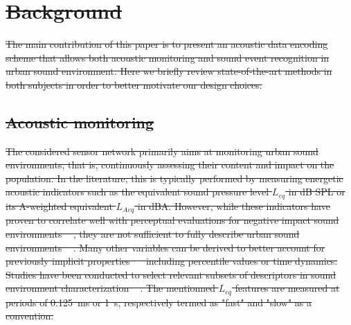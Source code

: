 \documentclass[sensors,article,submit,moreauthors,pdftex,10pt,a4paper]{mdpi}
\providecommand{\DIFaddtex}[1]{{\protect\color{blue}\uwave{#1}}} %
\providecommand{\DIFdeltex}[1]{{\protect\color{red}\sout{#1}}}                      %
\providecommand{\DIFaddbegin}{} %
\providecommand{\DIFaddend}{} %
\providecommand{\DIFdelbegin}{} %
\providecommand{\DIFdelend}{} %
\providecommand{\DIFadd}[1]{\texorpdfstring{\DIFaddtex{#1}}{#1}} %
\providecommand{\DIFdel}[1]{\texorpdfstring{\DIFdeltex{#1}}{}} %
\begin{document}
\section{\DIFdelbegin \DIFdel{Background}\DIFdelend \DIFaddbegin \DIFadd{Encoding scheme}\DIFaddend } \DIFdelbegin %
\DIFdelend \DIFaddbegin \label{sec:coder}
\DIFaddend 

\DIFdelbegin \DIFdel{The main contribution of this paper is to present an acoustic data encoding scheme that allows both acoustic monitoring and sound event recognition in urban sound environment. Here we briefly review state-of-the-art methods in both subjects in order to better motivate our design choices.
}\DIFdelend \DIFaddbegin \subsection{\DIFadd{Data content}}
\DIFaddend 


\DIFdelbegin \subsection{\DIFdel{Acoustic monitoring}}
\addtocounter{subsection}{-1}%

\DIFdel{The considered sensor network primarily aims at monitoring urban sound environments, that is, continuously assessing their content and impact on the population. In the literature, this is typically performed by measuring energetic acoustic indicators such as the equivalent sound pressure level $L_{eq}$ in dB SPL or its A-weighted equivalent $L_{Aeq}$ in dBA. However, while these indicators have proven to correlate well with perceptual evaluations for negative impact sound environments \mbox{%
\cite{gozalo2015}}%
, they are not sufficient to fully describe urban sound environments \mbox{%
\cite{rychtarikova2013}}%
. Many other variables can be derived to better account for previously implicit properties \mbox{%
\cite{can2016} }%
including percentile values or time dynamics. Studies have been conducted to select relevant subsets of descriptors in sound environment characterization \mbox{%
\cite{can2015, brocolini2013, nilsson2007}}%
. The mentionned $L_{eq}$ features are measured at periods of 0.125~ms or 1~s, respectively termed as "fast" and "slow" as a convention.
}%
\end{document}

